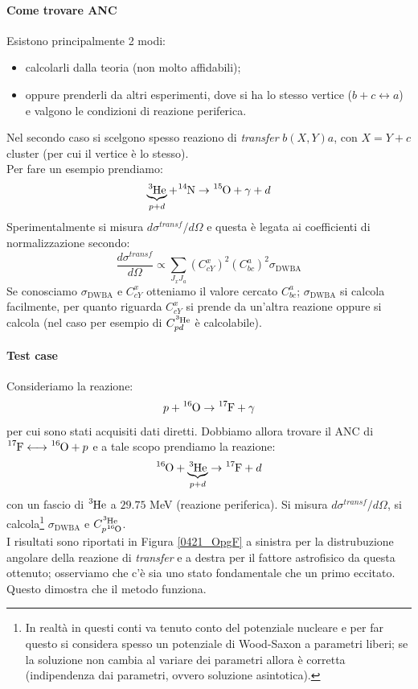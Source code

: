 \paragraph{Come trovare ANC} Esistono principalmente 2 modi:
\begin{itemize}
	\item calcolarli dalla teoria (non molto affidabili);
	\item oppure prenderli da altri esperimenti, dove si ha lo stesso vertice ($b+c \longleftrightarrow a$) e valgono le condizioni di reazione periferica.
\end{itemize}
\noindent Nel secondo caso si scelgono spesso reaziono di \textit{transfer} $b(X,Y)a$, con $X=Y+c$ cluster (per cui il vertice è lo stesso).\\ 
Per fare un esempio prendiamo:
$$\underbrace{\ce{^{3}He}}_{p+d} + \ce{^{14}N} \to \ce{^{15}O}+\gamma + d$$
Sperimentalmente si misura $d\sigma^{transf}/d\Omega$ e questa è legata ai coefficienti di normalizzazione secondo:
$$\frac{d\sigma^{transf}}{d\Omega}\propto \sum_{J_x J_a} (C_{cY}^x)^2 (C_{bc}^a)^2 \sigma_\text{DWBA}$$
Se conosciamo $\sigma_\text{DWBA}$ e $C_{cY}^x$ otteniamo il valore cercato $C_{bc}^a$; $\sigma_\text{DWBA}$ si calcola facilmente, per quanto riguarda $C_{cY}^x$ si prende da un'altra reazione oppure si calcola (nel caso per esempio di $C_{pd}^{\ce{^3He}}$ è calcolabile).

\paragraph{Test case} Consideriamo la reazione:
$$p+\ce{^{16}O} \to \ce{^{17}F} + \gamma$$
per cui sono stati acquisiti dati diretti. Dobbiamo allora trovare il ANC di $\ce{^{17}F} \longleftrightarrow \ce{^{16}O} + p$ e a tale scopo prendiamo la reazione:
$$\ce{^{16}O} + \underbrace{\ce{^3He}}_{p+d} \to \ce{^{17}F} + d$$
con un fascio di $\ce{^3He}$ a $29.75$ MeV (reazione periferica). Si misura $d\sigma^{transf}/d\Omega$, si calcola\footnote{In realtà in questi conti va tenuto conto del potenziale nucleare e per far questo si considera spesso un potenziale di Wood-Saxon a parametri liberi; se la soluzione non cambia al variare dei parametri allora è corretta (indipendenza dai parametri, ovvero soluzione asintotica).} $\sigma_\text{DWBA}$ e $C_{p\ce{^{16}O}}^{\ce{^3He}}$.\\ 
I risultati sono riportati in Figura \ref{0421_OpgF} a sinistra per la distrubuzione angolare della reazione di \textit{transfer} e a destra per il fattore astrofisico da questa ottenuto; osserviamo che c'è sia uno stato fondamentale che un primo eccitato. Questo dimostra che il metodo funziona.

